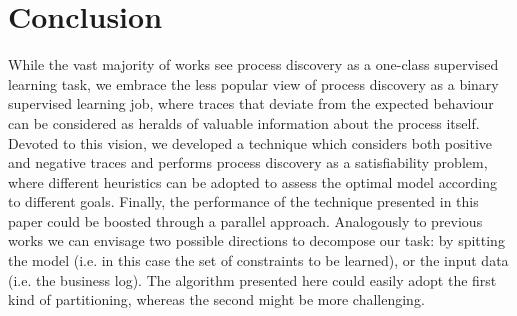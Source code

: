 
\section{Conclusion}
While the vast majority of works see process discovery as a one-class supervised learning task, we embrace the less popular view of process discovery as a binary supervised learning job, where traces that deviate from the expected behaviour can be considered as heralds of valuable information about the process itself. Devoted to this vision, we developed a technique which considers both positive and negative traces and performs process discovery as a satisfiability problem, where different heuristics can be adopted to assess the optimal model according to different goals.  
Finally, the performance of the technique presented in this paper could be boosted through a parallel approach. Analogously to previous works \cite{2018a-Maggi, 2018-Loreti, 2020b-Loreti} we can envisage two possible directions to decompose our task: by spitting the model (i.e. in this case the set of constraints to be learned), or the input data (i.e. the business log). The algorithm presented here could easily adopt the first kind of partitioning, whereas the second might be more challenging.
